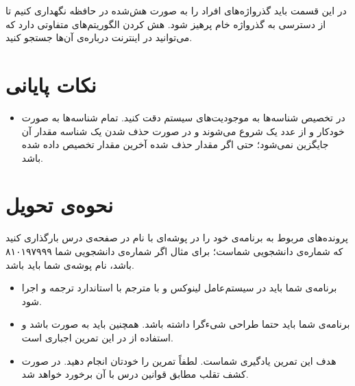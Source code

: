 \documentclass{utap}
\begin{document}
		در این قسمت باید گذرواژه‌های افراد را به صورت هش‌شده در حافظه نگهداری کنیم تا از دسترسی به گذرواژه خام پرهیز شود. هش کردن الگوریتم‌های متفاوتی دارد که می‌توانید در اینترنت درباره‌ی آن‌ها جستجو کنید.

	\section{نکات پایانی}
		\begin{itemize}
			\item  در تخصیص شناسه‌ها به موجودیت‌های سیستم دقت کنید. تمام شناسه‌ها به صورت خودکار و از عدد یک شروع می‌شوند و در صورت حذف شدن یک شناسه مقدار آن جایگزین نمی‌شود؛ حتی اگر مقدار حذف شده آخرین مقدار تخصیص داده شده باشد.
		
		\end{itemize}

	\section{نحوه‌ی تحویل}
		پرونده‌‌های مربوط به برنامه‌ی خود را در پوشه‌ای با نام  در صفحه‌ی  درس بارگذاری کنید که  شماره‌ی دانشجویی شماست؛ برای مثال اگر شماره‌ی دانشجویی شما ۸۱۰۱۹۷۹۹۹ باشد، نام پوشه‌ی شما باید  باشد.
		\begin{itemize}
			\item
						برنامه‌ی شما باید در سیستم‌عامل لینوکس و با مترجم  با استاندارد  ترجمه و اجرا شود.
					\item
						برنامه‌ی شما باید حتما طراحی شیءگرا داشته باشد. همچنین باید به صورت  باشد و استفاده از  در این تمرین اجباری است.
					\item
						هدف این تمرین یادگیری شماست. لطفاً تمرین را خودتان انجام دهید. در صورت کشف تقلب مطابق قوانین درس با آن برخورد خواهد شد.
		\end{itemize}
\end{document}
